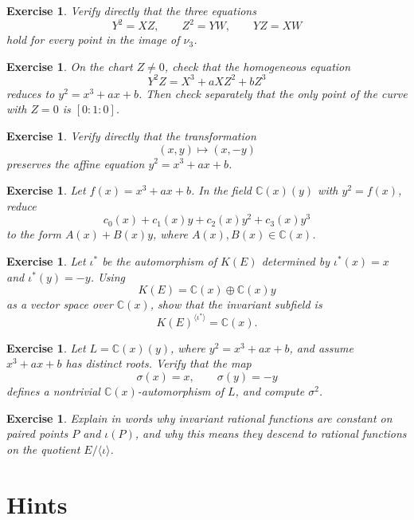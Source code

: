 \documentclass[11pt]{article}
\newtheorem{exercise}[theorem]{Exercise}
\theoremstyle{definition}
\theoremstyle{remark}
\newcommand{\C}{\mathbb{C}}
\newcommand{\K}{K}
\begin{document}
\begin{exercise}
Verify directly that the three equations
\[
  Y^2=XZ,\qquad Z^2=YW,\qquad YZ=XW
\]
hold for every point in the image of \(\nu_3\).
\end{exercise}

\begin{exercise}
On the chart \(Z\neq 0\), check that the homogeneous equation
\[
  Y^2Z=X^3+aXZ^2+bZ^3
\]
reduces to \(y^2=x^3+ax+b\).  Then check separately that the only point of
the curve with \(Z=0\) is \([0:1:0]\).
\end{exercise}

\begin{exercise}
Verify directly that the transformation
\[
  (x,y)\longmapsto (x,-y)
\]
preserves the affine equation \(y^2=x^3+ax+b\).
\end{exercise}

\begin{exercise}
Let \(f(x)=x^3+ax+b\).  In the field \(\C(x)(y)\) with \(y^2=f(x)\), reduce
\[
  c_0(x)+c_1(x)y+c_2(x)y^2+c_3(x)y^3
\]
to the form \(A(x)+B(x)y\), where \(A(x),B(x)\in \C(x)\).
\end{exercise}

\begin{exercise}
Let \(\iota^*\) be the automorphism of \(\K(E)\) determined by
\(\iota^*(x)=x\) and \(\iota^*(y)=-y\).  Using
\[
  \K(E)=\C(x)\oplus \C(x)y
\]
as a vector space over \(\C(x)\), show that the invariant subfield is
\[
  \K(E)^{\langle\iota^*\rangle}=\C(x).
\]
\end{exercise}

\begin{exercise}
Let \(L=\C(x)(y)\), where \(y^2=x^3+ax+b\), and assume
\(x^3+ax+b\) has distinct roots.  Verify that the map
\[
  \sigma(x)=x,\qquad \sigma(y)=-y
\]
defines a nontrivial \(\C(x)\)-automorphism of \(L\), and compute
\(\sigma^2\).
\end{exercise}

\begin{exercise}
Explain in words why invariant rational functions are constant on paired
points \(P\) and \(\iota(P)\), and why this means they descend to rational
functions on the quotient \(E/\langle\iota\rangle\).
\end{exercise}

\section*{Hints}
\end{document}
